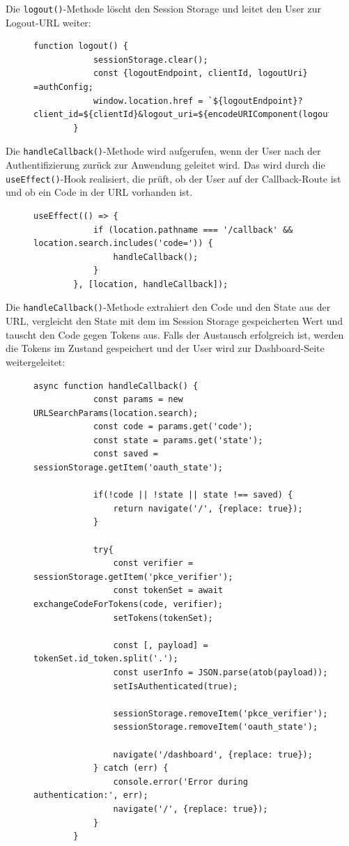 Die \texttt{logout()}-Methode löscht den Session Storage und leitet den User zur Logout-URL weiter:
\begin{figure}[H]
    \begin{lstlisting}[caption=Logout-Methode, label=list:authcontextlogout]
        function logout() {
            sessionStorage.clear();
            const {logoutEndpoint, clientId, logoutUri} =authConfig;
            window.location.href = `${logoutEndpoint}?client_id=${clientId}&logout_uri=${encodeURIComponent(logoutUri)}`; 
        }
    \end{lstlisting}
\end{figure}
Die \texttt{handleCallback()}-Methode wird aufgerufen, wenn der User nach der Authentifizierung zurück zur Anwendung geleitet wird.
Das wird durch die \texttt{useEffect()}-Hook realisiert, die prüft, ob der User auf der Callback-Route ist und ob ein Code in der URL vorhanden ist.
\begin{figure}[H]
    \begin{lstlisting}[caption=Callback-Handling, label=list:authcontextcallback]
        useEffect(() => {
            if (location.pathname === '/callback' && location.search.includes('code=')) {
                handleCallback();
            }
        }, [location, handleCallback]);
\end{lstlisting}
\end{figure}
Die \texttt{handleCallback()}-Methode extrahiert den Code und den State aus der URL, vergleicht den State mit dem im Session Storage gespeicherten Wert und tauscht den Code gegen Tokens aus.
Falls der Austausch erfolgreich ist, werden die Tokens im Zustand gespeichert und der User wird zur Dashboard-Seite weitergeleitet:
\begin{figure}[H]
    \begin{lstlisting}[caption=Callback-Handling, label=list:authcontextcallback2]
        async function handleCallback() {
            const params = new URLSearchParams(location.search);
            const code = params.get('code');
            const state = params.get('state');
            const saved = sessionStorage.getItem('oauth_state');

            if(!code || !state || state !== saved) {
                return navigate('/', {replace: true});
            }

            try{
                const verifier = sessionStorage.getItem('pkce_verifier');
                const tokenSet = await exchangeCodeForTokens(code, verifier);
                setTokens(tokenSet);

                const [, payload] = tokenSet.id_token.split('.');
                const userInfo = JSON.parse(atob(payload));
                setIsAuthenticated(true);

                sessionStorage.removeItem('pkce_verifier');
                sessionStorage.removeItem('oauth_state');

                navigate('/dashboard', {replace: true});
            } catch (err) {
                console.error('Error during authentication:', err);
                navigate('/', {replace: true});
            }
        }
    \end{lstlisting}
\end{figure}
